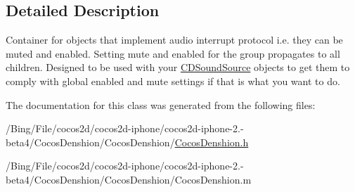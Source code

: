 \subsection{Detailed Description}
Container for objects that implement audio interrupt protocol i.\-e. they can be muted and enabled. Setting mute and enabled for the group propagates to all children. Designed to be used with your \hyperlink{interface_c_d_sound_source}{C\-D\-Sound\-Source} objects to get them to comply with global enabled and mute settings if that is what you want to do. 

The documentation for this class was generated from the following files\-:\begin{DoxyCompactItemize}
\item 
/\-Bing/\-File/cocos2d/cocos2d-\/iphone/cocos2d-\/iphone-\/2.-\/beta4/\-Cocos\-Denshion/\-Cocos\-Denshion/\hyperlink{_cocos_denshion_8h}{Cocos\-Denshion.\-h}\item 
/\-Bing/\-File/cocos2d/cocos2d-\/iphone/cocos2d-\/iphone-\/2.-\/beta4/\-Cocos\-Denshion/\-Cocos\-Denshion/Cocos\-Denshion.\-m\end{DoxyCompactItemize}
